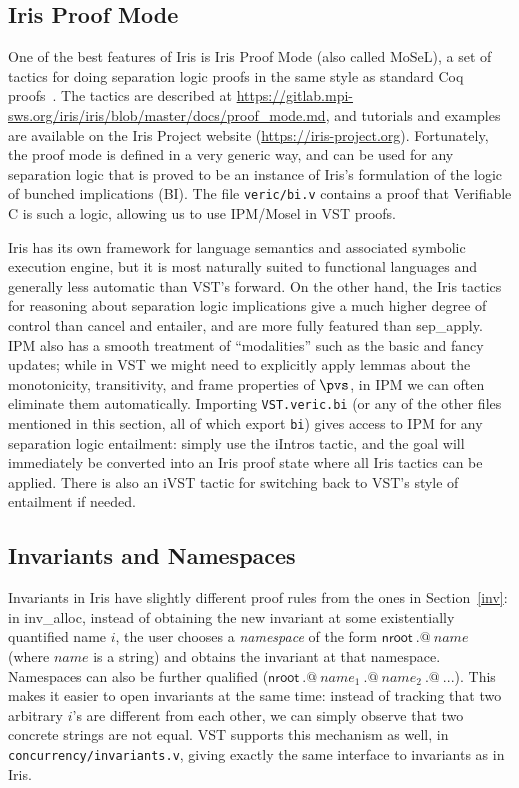 \documentclass[11pt]{article}
\begin{document}
\subsection{Iris Proof Mode}
One of the best features of Iris is Iris Proof Mode (also called MoSeL), a set of tactics for doing separation logic proofs in the same style as standard Coq proofs~\cite{ipm}. The tactics are described at \url{https://gitlab.mpi-sws.org/iris/iris/blob/master/docs/proof_mode.md}, and tutorials and examples are available on the Iris Project website (\url{https://iris-project.org}). Fortunately, the proof mode is defined in a very generic way, and can be used for any separation logic that is proved to be an instance of Iris's formulation of the logic of bunched implications (BI). The file \texttt{veric/bi.v} contains a proof that Verifiable C is such a logic, allowing us to use IPM/Mosel in VST proofs.

Iris has its own framework for language semantics and associated symbolic execution engine, but it is most naturally suited to functional languages and generally less automatic than VST's \textsf{forward}. On the other hand, the Iris tactics for reasoning about separation logic implications give a much higher degree of control than \textsf{cancel} and \textsf{entailer}, and are more fully featured than \textsf{sep\_apply}. IPM also has a smooth treatment of ``modalities'' such as the basic and fancy updates; while in VST we might need to explicitly apply lemmas about the monotonicity, transitivity, and frame properties of $\pvs$, in IPM we can often eliminate them automatically. Importing \texttt{VST.veric.bi} (or any of the other files mentioned in this section, all of which export \texttt{bi}) gives access to IPM for any separation logic entailment: simply use the \textsf{iIntros} tactic, and the goal will immediately be converted into an Iris proof state where all Iris tactics can be applied. There is also an \textsf{iVST} tactic for switching back to VST's style of entailment if needed.

\subsection{Invariants and Namespaces}
Invariants in Iris have slightly different proof rules from the ones in Section~\ref{inv}: in \textsf{inv\_alloc}, instead of obtaining the new invariant at some existentially quantified name $i$, the user chooses a \emph{namespace} of the form $\mathsf{nroot}\ .@\ \mathit{name}$ (where $\mathit{name}$ is a string) and obtains the invariant at that namespace. Namespaces can also be further qualified ($\mathsf{nroot}\ .@\ \mathit{name}_1\ .@\ \mathit{name}_2\ .@\ ...$). This makes it easier to open invariants at the same time: instead of tracking that two arbitrary $i$'s are different from each other, we can simply observe that two concrete strings are not equal. VST supports this mechanism as well, in \texttt{concurrency/invariants.v}, giving exactly the same interface to invariants as in Iris.
\end{document}
